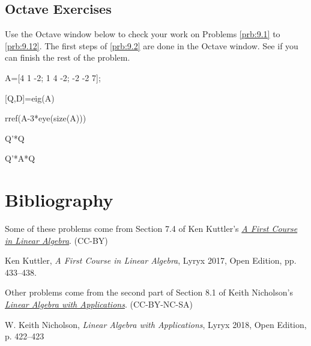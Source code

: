 \documentclass{ximera}
\begin{document}
\subsection*{Octave Exercises}
\begin{problem}\label{oct:ortho_diagonalize}
Use the Octave window below to check your work on Problems \ref{prb:9.1} to \ref{prb:9.12}.  The first steps of \ref{prb:9.2} are done in the Octave window.  See if you can finish the rest of the problem.

A=[4 1 -2; 1 4 -2; -2 -2 7];

[Q,D]=eig(A)

rref(A-3*eye(size(A)))

Q'*Q

Q'*A*Q

\end{problem}

\section*{Bibliography}
Some of these problems come from Section 7.4 of Ken Kuttler's \href{https://open.umn.edu/opentextbooks/textbooks/a-first-course-in-linear-algebra-2017}{\it A First Course in Linear Algebra}. (CC-BY)

Ken Kuttler, {\it  A First Course in Linear Algebra}, Lyryx 2017, Open Edition, pp. 433--438.  

Other problems come from the second part of Section 8.1 of Keith Nicholson's \href{https://open.umn.edu/opentextbooks/textbooks/linear-algebra-with-applications}{\it Linear Algebra with Applications}. (CC-BY-NC-SA)

W. Keith Nicholson, {\it Linear Algebra with Applications}, Lyryx 2018, Open Edition, p. 422--423 
\end{document}
